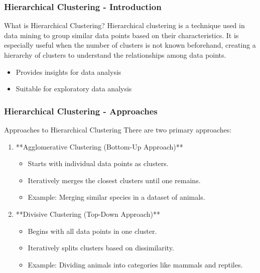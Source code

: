 \documentclass[aspectratio=169]{beamer}
\begin{document}
\begin{frame}[fragile]
    \frametitle{Hierarchical Clustering - Introduction}
    \begin{block}{What is Hierarchical Clustering?}
        Hierarchical clustering is a technique used in data mining to group similar data points based on their characteristics. It is especially useful when the number of clusters is not known beforehand, creating a hierarchy of clusters to understand the relationships among data points.
    \end{block}
    \begin{itemize}
        \item Provides insights for data analysis
        \item Suitable for exploratory data analysis
    \end{itemize}
\end{frame}

\begin{frame}[fragile]
    \frametitle{Hierarchical Clustering - Approaches}
    \begin{block}{Approaches to Hierarchical Clustering}
        There are two primary approaches:
    \end{block}
    
    \begin{enumerate}
        \item **Agglomerative Clustering (Bottom-Up Approach)**
            \begin{itemize}
                \item Starts with individual data points as clusters.
                \item Iteratively merges the closest clusters until one remains.
                \item Example: Merging similar species in a dataset of animals.
            \end{itemize}
        
        \item **Divisive Clustering (Top-Down Approach)**
            \begin{itemize}
                \item Begins with all data points in one cluster.
                \item Iteratively splits clusters based on dissimilarity.
                \item Example: Dividing animals into categories like mammals and reptiles.
            \end{itemize}
    \end{enumerate}
\end{frame}
\end{document}
